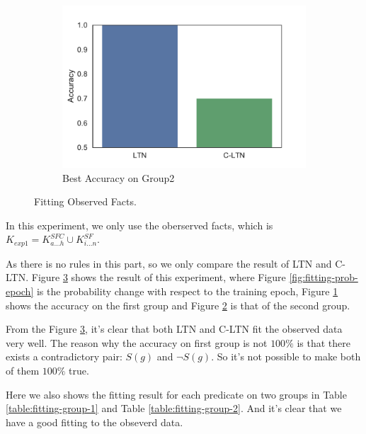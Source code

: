 \begin{figure}[!]
\begin{subfigure}[]{0.33\textwidth}
        \label{fig:fitting-best-accuracy-1}
    \end{subfigure}~~~~
    \begin{subfigure}[]{0.33\textwidth}
        \includegraphics[width=\textwidth]{img/bar2.pdf}
        \caption{Best Accuracy on Group2}
        \label{fig:fitting-best-accuracy-2}
    \end{subfigure}
    \caption{Fitting Observed Facts.}
    \label{fig:fitting}
\end{figure}

In this experiment, we only use the oberserved facts, which is $K_{exp1} = K^{SFC}_{a \dots h} \cup K^{SF}_{i\dots n}$.

As there is no rules in this part, so we only compare the result of LTN and C-LTN.
Figure \ref{fig:fitting} shows the result of this experiment, where Figure \ref{fig:fitting-prob-epoch} is the probability change with respect to the training epoch, Figure \ref{fig:fitting-best-accuracy-1} shows the accuracy on the first group and Figure \ref{fig:fitting-best-accuracy-2} is that of the second group.

From the Figure \ref{fig:fitting}, it's clear that both LTN and C-LTN fit the observed data very well. The reason why the accuracy on first group is not $100\%$ is that there exists a contradictory pair: $S(g)$ and $\neg S(g)$. So it's not possible to make both of them $100\%$ true.

Here we also shows the fitting result for each predicate on two groups in Table \ref{table:fitting-group-1} and Table \ref{table:fitting-group-2}. And it's clear that we have a good fitting to the obseverd data.

